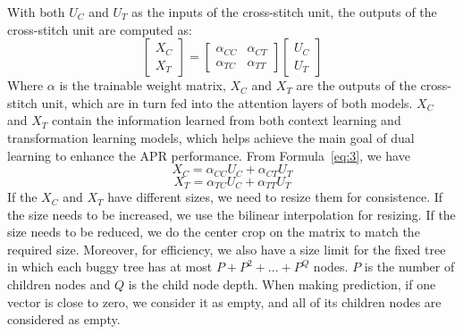 With both $U_C$ and $U_T$ as the inputs of the cross-stitch unit, the
outputs of the cross-stitch unit are computed as:
\begin{equation}\label{eq:3}
	\begin{bmatrix}
		X_C\\
		X_T
	\end{bmatrix}
	=
	\begin{bmatrix}
		\alpha_{CC} &  \alpha_{CT} \\
		\alpha_{TC} &  \alpha_{TT}
	\end{bmatrix}
	\begin{bmatrix}
		U_C\\
		U_T
	\end{bmatrix}
\end{equation}
Where $\alpha$ is the trainable weight matrix, $X_C$ and $X_T$ are the
outputs of the cross-stitch unit, which are in turn fed into the
attention layers of both models. $X_C$ and $X_T$ contain the
information learned from both context learning and transformation
learning models, which helps achieve the main goal of dual learning
to enhance the APR performance. From Formula~\ref{eq:3}, we have
\begin{equation}\label{eq:4}
	X_C = \alpha_{CC}U_C + \alpha_{CT}U_T
\end{equation}
\begin{equation}\label{eq:5}
	X_T = \alpha_{TC}U_C + \alpha_{TT}U_T
\end{equation}
If the $X_C$ and $X_T$ have different sizes, we need to resize them
for consistence. If the size needs to be increased, we use the
bilinear interpolation for resizing. If the size needs to be reduced,
we do the center crop on the matrix to match the required
size. Moreover, for efficiency, we also have a size limit for the
fixed tree in which each buggy tree has at most $P+P^2+...+P^Q$
nodes.  $P$ is the number of children nodes and $Q$ is the child node
depth. When making prediction, if one vector is close to zero, we consider
it as empty, and all of its children nodes are considered as empty.


